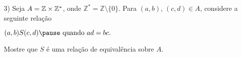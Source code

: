\documentclass{beamer}
\begin{document}
    \begin{frame}
    \end{frame}
    \begin{frame}
        \begin{exemplos}
            \begin{itemize}[label={\arabic*})]                
                \item[3)] Seja $A = \mathbb{Z} \times \mathbb{Z}^*$, onde $\mathbb{Z}^* = \mathbb{Z} \setminus \{0\}$. \pause  Para $(a, b)$, $(c, d) \in A$, \pause considere a seguinte rela{\c c}{\~a}o\pause
                \begin{center}
                    $(a, b) S (c, d) \pause \mbox{ quando } ad = bc.$
                \end{center}
                Mostre que $S$ \'e uma rela{\c c}{\~a}o de equival{\^e}ncia sobre $A$.\pause
            \end{itemize}
        \end{exemplos}
        \vspace{3cm}
    \end{frame}
    \begin{frame}
    \end{frame}
\end{document}
